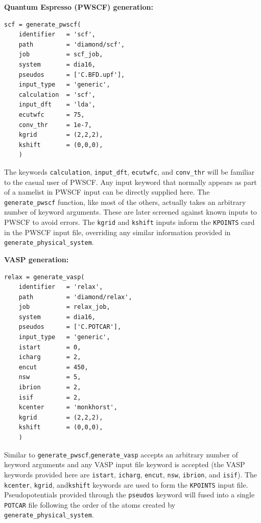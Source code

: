 \documentclass[oneside,11pt]{memoir}
\numberwithin{equation}{section}
\begin{document}
\vspace*{3mm}
\noindent
\textbf{Quantum Espresso (PWSCF) generation:}
\begin{verbatim}
scf = generate_pwscf(
    identifier   = 'scf',
    path         = 'diamond/scf',
    job          = scf_job,
    system       = dia16,
    pseudos      = ['C.BFD.upf'], 
    input_type   = 'generic',
    calculation  = 'scf',
    input_dft    = 'lda', 
    ecutwfc      = 75,   
    conv_thr     = 1e-7, 
    kgrid        = (2,2,2),                
    kshift       = (0,0,0),              
    )
\end{verbatim}

\noindent
The keywords \texttt{calculation}, \texttt{input\_dft}, \texttt{ecutwfc}, and \texttt{conv\_thr} will be familiar to the casual user of PWSCF.  Any input keyword that normally appears as part of a namelist in PWSCF input can be directly supplied here.  The \texttt{generate\_pwscf} function, like most of the others, actually takes an arbitrary number of keyword arguments.  These are later screened against known inputs to PWSCF to avoid errors.  The \texttt{kgrid} and \texttt{kshift} inputs inform the \texttt{KPOINTS} card in the PWSCF input file, overriding any similar information provided in \texttt{generate\_physical\_system}.

\vspace*{3mm}
\noindent
\textbf{VASP generation:}
\begin{verbatim}
relax = generate_vasp(      
    identifier   = 'relax', 
    path         = 'diamond/relax',
    job          = relax_job,
    system       = dia16,            
    pseudos      = ['C.POTCAR'], 
    input_type   = 'generic',
    istart       = 0, 
    icharg       = 2,
    encut        = 450,
    nsw          = 5,
    ibrion       = 2,
    isif         = 2,
    kcenter      = 'monkhorst',
    kgrid        = (2,2,2),                
    kshift       = (0,0,0),              
    )
\end{verbatim}

\noindent
Similar to \texttt{generate\_pwscf},\texttt{generate\_vasp} accepts an arbitrary number of keyword arguments and any VASP input file keyword is accepted (the VASP keywords provided here are \texttt{istart}, \texttt{icharg}, \texttt{encut}, \texttt{nsw}, \texttt{ibrion}, and \texttt{isif}).  The \texttt{kcenter}, \texttt{kgrid}, and\texttt{kshift} keywords are used to form the \texttt{KPOINTS} input file.  Pseudopotentials provided through the \texttt{pseudos} keyword will fused into a single \texttt{POTCAR} file following the order of the atoms created by \texttt{generate\_physical\_system}.
\end{document}
